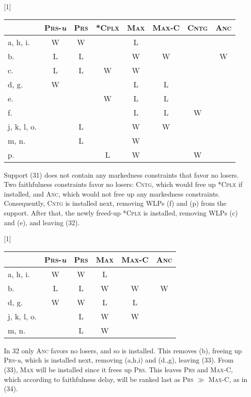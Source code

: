 \documentclass[output=paper,
modfonts
]{LSP/langsci}
\begin{document}
\ea 
\renewcommand*\arraystretch{1.2}
\scalebox{1}[1]{\begin{tabular}[t]{|l||c|c|c||c|c|c|c|}
\firsthline & \textsc{Prs}-\textit{u} & \textsc{Prs} & \textsc{*Cplx} & \textsc{Max} & \textsc{Max-C} &  \textsc{Cntg} &  \textsc{Anc} \\
\hline
\hline a, h, i. & W & W & & L & & & \\
\hline b. & L & L & & W & W & & W \\
\hline c. & L & L & W & W & & & \\
\hline d, g. & W & & & L & L & & \\
\hline e. & & & W & L & L & &\\
\hline f. & & & & L & L & W &\\
\hline j, k, l, o. & & L & & W & W & &\\
\hline m, n. & & L & & W & & &\\
\hline p. & & & L & W & & W & \\
\hline \end{tabular}} \renewcommand*\arraystretch{1}
\z

Support (31) does not contain any markedness constraints that favor no losers. Two faithfulness constraints favor no losers: \textsc{Cntg}, which would free up *\textsc{Cplx} if installed, and \textsc{Anc,} which would not free up any markedness constraints. Consequently, \textsc{Cntg} is installed next, removing WLPs (f) and (p) from the support. After that, the newly freed-up *\textsc{Cplx} is installed, removing WLPs (c) and (e), and leaving (32). 

\ea 
\renewcommand*\arraystretch{1.2}
\scalebox{1}[1]{\begin{tabular}[t]{|l||c|c||c|c|c|}
\firsthline & \textsc{Prs}-\textit{u} & \textsc{Prs} & \textsc{Max} & \textsc{Max-C} &  \textsc{Anc} \\
\hline
\hline a, h, i. & W & W & L & &  \\
\hline b. & L & L & W & W & W \\
\hline d, g. & W & W & L & L & \\
\hline j, k, l, o. & & L & W & W & \\
\hline m, n. & & L & W & & \\
\hline \end{tabular}} \renewcommand*\arraystretch{1}
\z

In 32 only \textsc{Anc} favors no losers, and so is installed. This removes (b), freeing up \textsc{Prs}-\textit{u}, which is installed next, removing (a,h,i) and (d.,g), leaving (33). From (33), \textsc{Max} will be installed since it frees up \textsc{Prs}. This leaves \textsc{Prs} and \textsc{Max-C}, which according to faithfulness delay, will be ranked last as \textsc{Prs} \textsc{${\gg}$} \textsc{Max-C,} as in (34). 
\end{document}
